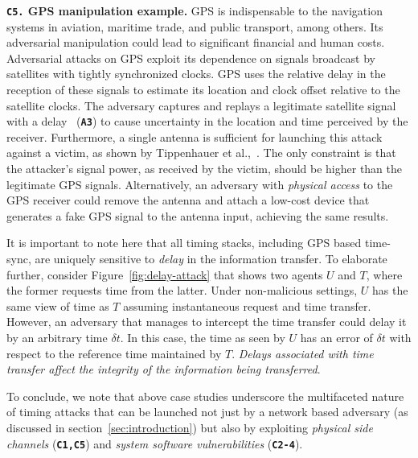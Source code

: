 \noindent\textbf{\texttt{C5.} GPS manipulation example.} GPS is indispensable to the navigation systems in aviation, maritime trade, and public transport, among others. Its adversarial manipulation could lead to significant financial and human costs. Adversarial attacks on GPS exploit its dependence on signals broadcast by satellites with tightly synchronized clocks. GPS uses the relative delay in the reception of these signals to estimate its location and clock offset relative to the satellite clocks. The adversary captures and replays a legitimate satellite signal with a delay~\cite{gps-spoofing-fundamentals} (\textbf{\texttt{A3}}) to cause uncertainty in the location and time perceived by the receiver. Furthermore, a single antenna is sufficient for launching this attack against a victim, as shown by Tippenhauer et al.,~\cite{gps-spoofing-fundamentals}. The only constraint is that the attacker's signal power, as received by the victim, should be higher than the legitimate GPS signals. Alternatively, an adversary with \textit{physical access} to the GPS receiver could remove the antenna and attach a low-cost device that generates a fake GPS signal to the antenna input, achieving the same results.

It is important to note here that all timing stacks, including GPS based time-sync, are uniquely sensitive to \textit{delay} in the information transfer. To elaborate further, consider Figure~\ref{fig:delay-attack} that shows two agents $U$ and $T$, where the former requests time from the latter. Under non-malicious settings, $U$ has the same view of time as $T$ assuming instantaneous request and time transfer. However, an adversary that manages to intercept the time transfer could delay it by an arbitrary time $\delta t$. In this case, the time as seen by $U$ has an error of $\delta t$ with respect to the reference time maintained by $T$. \textit{Delays associated with time transfer affect the integrity of the information being transferred}. 

To conclude, we note that above case studies underscore the multifaceted nature of timing attacks that can be launched not just by a network based adversary (as discussed in section~\ref{sec:introduction}) but also by exploiting \textit{physical side channels} (\textbf{\texttt{C1,C5}}) and \textit{system software vulnerabilities} (\textbf{\texttt{C2-4}}).

